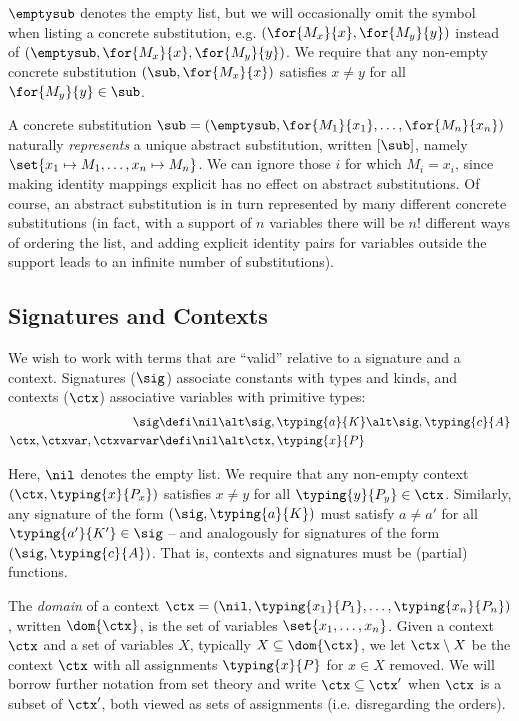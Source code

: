 $\emptysub$ denotes the empty list, but we will occasionally omit the symbol when listing a concrete substitution, e.g. $(\for{M_x}{x}, \for{M_y}{y})$ instead of $(\emptysub, \for{M_x}{x}, \for{M_y}{y})$.
We require that any non-empty concrete substitution $(\sub, \for{M_x}{x})$ satisfies $x \neq y$ for all $\for{M_y}{y} \in \sub$.

A concrete substitution $\sub = (\emptysub, \for{M_1}{x_1}, \ldots, \for{M_n}{x_n})$ naturally \emph{represents} a unique abstract substitution, written $[\sub]$, namely $\set{x_1 \mapsto M_1, \ldots, x_n \mapsto M_n}$.
We can ignore those $i$ for which $M_i = x_i$, since making identity mappings explicit has no effect on abstract substitutions.
Of course, an abstract substitution is in turn represented by many different concrete substitutions (in fact, with a support of $n$ variables there will be $n!$ different ways of ordering the list, and adding explicit identity pairs for variables outside the support leads to an infinite number of substitutions).



\subsection*{Signatures and Contexts}

We wish to work with terms that are ``valid'' relative to a signature and a context.
Signatures ($\sig$) associate constants with types and kinds, and contexts ($\ctx$) associative variables with primitive types:
\begin{align*}
  \sig &\defi \nil \alt \sig, \typing{a}{K} \alt \sig, \typing{c}{A} \\
  \ctx, \ctxvar, \ctxvarvar &\defi \nil \alt \ctx, \typing{x}{P}
\end{align*}

Here, $\nil$ denotes the empty list.
We require that any non-empty context $(\ctx, \typing{x}{P_x})$ satisfies $x \neq y$ for all $\typing{y}{P_y} \in \ctx$.
Similarly, any signature of the form $(\sig, \typing{a}{K})$ must satisfy $a \neq a'$ for all $\typing{a'}{K'} \in \sig$ -- and analogously for signatures of the form $(\sig, \typing{c}{A})$.
That is, contexts and signatures must be (partial) functions.

The \emph{domain} of a context $\ctx = (\nil, \typing{x_1}{P_1}, \ldots, \typing{x_n}{P_n})$, written $\dom{\ctx}$, is the set of variables $\set{x_1, \ldots, x_n}$.
Given a context $\ctx$ and a set of variables $X$, typically $X \subseteq \dom{\ctx}$, we let $\ctx \setminus X$ be the context $\ctx$ with all assignments $\typing{x}{P}$ for $x \in X$ removed.
We will borrow further notation from set theory and write $\ctx \subseteq \ctx'$ when $\ctx$ is a subset of $\ctx'$, both viewed as sets of assignments (i.e. disregarding the orders).

